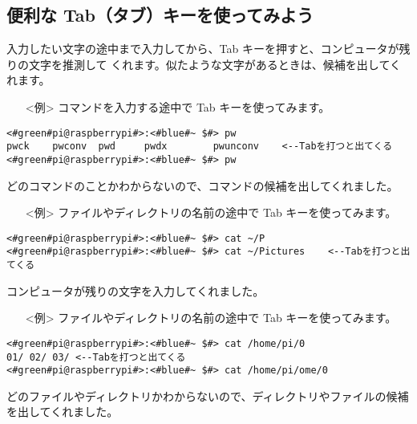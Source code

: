\subsection{便利な Tab（タブ）キーを使ってみよう}
入力したい文字の途中まで入力してから、Tab キーを押すと、コンピュータが残りの文字を推測して
くれます。似たような文字があるときは、候補を出してくれます。
\begin{itemize}
\item[<例>]コマンドを入力する途中で Tab キーを使ってみます。
\end{itemize}
\begin{lstlisting}[caption=Tabの例1, label=Tab1]
<#green#pi@raspberrypi#>:<#blue#~ $#> pw
pwck	pwconv	pwd		pwdx		pwunconv	<--Tabを打つと出てくる
<#green#pi@raspberrypi#>:<#blue#~ $#> pw
\end{lstlisting}
どのコマンドのことかわからないので、コマンドの候補を出してくれました。
\begin{itemize}
\item[<例>]ファイルやディレクトリの名前の途中で Tab キーを使ってみます。
\end{itemize}
\begin{lstlisting}[caption=Tabの例2, label=Tab2]
<#green#pi@raspberrypi#>:<#blue#~ $#> cat ~/P
<#green#pi@raspberrypi#>:<#blue#~ $#> cat ~/Pictures	<--Tabを打つと出てくる
\end{lstlisting}
コンピュータが残りの文字を入力してくれました。
\begin{itemize}
\item[<例>]ファイルやディレクトリの名前の途中で Tab キーを使ってみます。
\end{itemize}
\begin{lstlisting}[caption=Tabの例3, label=Tab3]
<#green#pi@raspberrypi#>:<#blue#~ $#> cat /home/pi/0
01/	02/	03/	<--Tabを打つと出てくる
<#green#pi@raspberrypi#>:<#blue#~ $#> cat /home/pi/ome/0
\end{lstlisting}
どのファイルやディレクトリかわからないので、ディレクトリやファイルの候補を出してくれました。